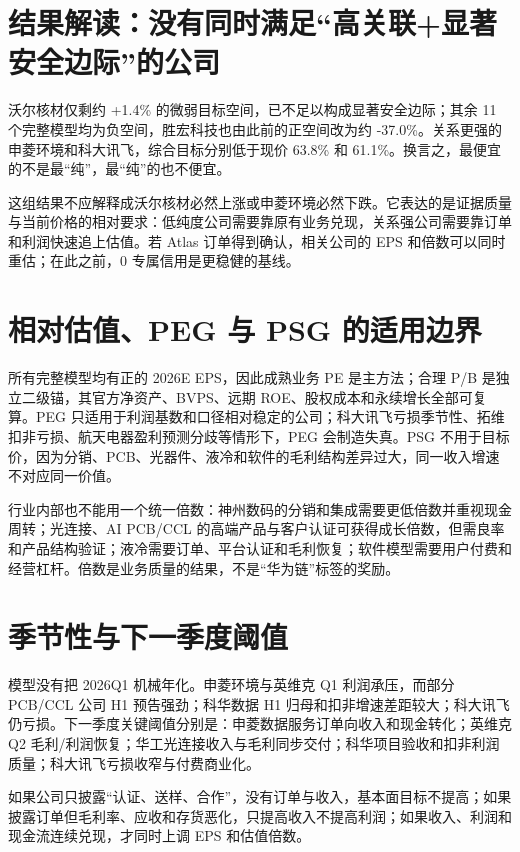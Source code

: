 \section{结果解读：没有同时满足“高关联+显著安全边际”的公司}

沃尔核材仅剩约 +1.4\% 的微弱目标空间，已不足以构成显著安全边际；其余 11 个完整模型均为负空间，胜宏科技也由此前的正空间改为约 -37.0\%。关系更强的申菱环境和科大讯飞，综合目标分别低于现价 63.8\% 和 61.1\%。换言之，最便宜的不是最“纯”，最“纯”的也不便宜。

这组结果不应解释成沃尔核材必然上涨或申菱环境必然下跌。它表达的是证据质量与当前价格的相对要求：低纯度公司需要靠原有业务兑现，关系强公司需要靠订单和利润快速追上估值。若 Atlas 订单得到确认，相关公司的 EPS 和倍数可以同时重估；在此之前，0 专属信用是更稳健的基线。

\section{相对估值、PEG 与 PSG 的适用边界}

所有完整模型均有正的 2026E EPS，因此成熟业务 PE 是主方法；合理 P/B 是独立二级锚，其官方净资产、BVPS、远期 ROE、股权成本和永续增长全部可复算。PEG 只适用于利润基数和口径相对稳定的公司；科大讯飞亏损季节性、拓维扣非亏损、航天电器盈利预测分歧等情形下，PEG 会制造失真。PSG 不用于目标价，因为分销、PCB、光器件、液冷和软件的毛利结构差异过大，同一收入增速不对应同一价值。

行业内部也不能用一个统一倍数：神州数码的分销和集成需要更低倍数并重视现金周转；光连接、AI PCB/CCL 的高端产品与客户认证可获得成长倍数，但需良率和产品结构验证；液冷需要订单、平台认证和毛利恢复；软件模型需要用户付费和经营杠杆。倍数是业务质量的结果，不是“华为链”标签的奖励。

\section{季节性与下一季度阈值}

模型没有把 2026Q1 机械年化。申菱环境与英维克 Q1 利润承压，而部分 PCB/CCL 公司 H1 预告强劲；科华数据 H1 归母和扣非增速差距较大；科大讯飞仍亏损。下一季度关键阈值分别是：申菱数据服务订单向收入和现金转化；英维克 Q2 毛利/利润恢复；华工光连接收入与毛利同步交付；科华项目验收和扣非利润质量；科大讯飞亏损收窄与付费商业化。

如果公司只披露“认证、送样、合作”，没有订单与收入，基本面目标不提高；如果披露订单但毛利率、应收和存货恶化，只提高收入不提高利润；如果收入、利润和现金流连续兑现，才同时上调 EPS 和估值倍数。

